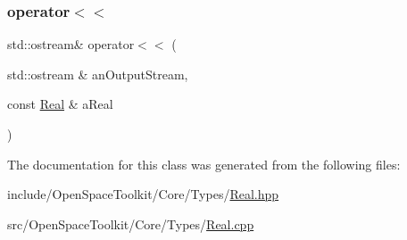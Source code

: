\mbox{\label{classostk_1_1core_1_1types_1_1_real_a36816b0e006fd2ec3b0c53406439c7c3}} 
\subsubsection{\texorpdfstring{operator$<$$<$}{operator<<}}
{\footnotesize\ttfamily std\+::ostream\& operator$<$$<$ (\begin{DoxyParamCaption}\item[{std\+::ostream \&}]{an\+Output\+Stream,  }\item[{const \hyperlink{classostk_1_1core_1_1types_1_1_real}{Real} \&}]{a\+Real }\end{DoxyParamCaption})\hspace{0.3cm}{\ttfamily [friend]}}



The documentation for this class was generated from the following files\+:\begin{DoxyCompactItemize}
\item 
include/\+Open\+Space\+Toolkit/\+Core/\+Types/\hyperlink{_real_8hpp}{Real.\+hpp}\item 
src/\+Open\+Space\+Toolkit/\+Core/\+Types/\hyperlink{_real_8cpp}{Real.\+cpp}\end{DoxyCompactItemize}
